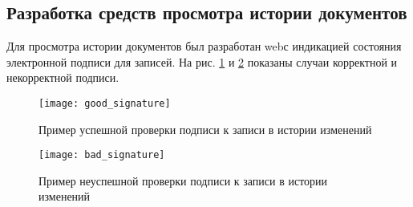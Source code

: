 \subsection{Разработка средств просмотра истории документов} \label{git_history}

Для просмотра истории документов был разработан web с индикацией состояния электронной подписи для записей. На рис. \ref{img:good_signature} и \ref{img:bad_signature} показаны случаи корректной и некорректной подписи.

\begin{figure}[h!]
	\centering
	\texttt{[image: good\_signature]}
	\caption{Пример успешной проверки подписи к записи в истории изменений}
	\label{img:good_signature}
\end{figure}

\begin{figure}[h!]
	\centering
	\texttt{[image: bad\_signature]}
	\caption{Пример неуспешной проверки подписи к записи в истории изменений}
	\label{img:bad_signature}
\end{figure}
\FloatBarrier